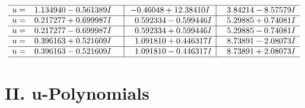 \documentclass[1p]{elsarticle_modified}
\theoremstyle{definition}
\begin{document}
$$\begin{array}{c|c|c}
 \hline 
\begin{aligned}
u &= \phantom{-}1.134940 - 0.561389 I\end{aligned}
 & -0.46048 + 12.38410 I & \phantom{-}3.84214 - 8.57579 I \\ \hline\begin{aligned}
u &= \phantom{-}0.217277 + 0.699987 I\end{aligned}
 & \phantom{-}0.592334 - 0.599446 I & \phantom{-}5.29885 + 0.74081 I \\ \hline\begin{aligned}
u &= \phantom{-}0.217277 - 0.699987 I\end{aligned}
 & \phantom{-}0.592334 + 0.599446 I & \phantom{-}5.29885 - 0.74081 I \\ \hline\begin{aligned}
u &= \phantom{-}0.396163 + 0.521609 I\end{aligned}
 & \phantom{-}1.091810 + 0.446317 I & \phantom{-}8.73891 - 2.08073 I \\ \hline\begin{aligned}
u &= \phantom{-}0.396163 - 0.521609 I\end{aligned}
 & \phantom{-}1.091810 - 0.446317 I & \phantom{-}8.73891 + 2.08073 I\\
 \hline 
 \end{array}$$\newpage
\newpage\renewcommand{\arraystretch}{1}
\centering \section*{ II. u-Polynomials}
\end{document}
